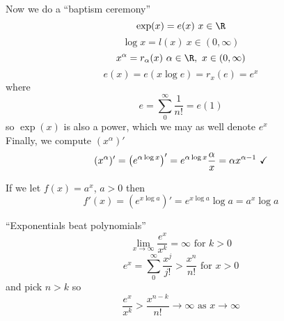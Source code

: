 \begin{normal}
Now we do a ``baptism ceremony''
\[\exp(x) = e(x) \ x\in \R\]
\[\log x = l(x) \ x\in (0,\infty)\]
\[x^\alpha = r_\alpha(x) \ \alpha \in \R, \ x\in (0,\infty)\]
\[e(x) = e(x\log e) = r_x(e) = e^x\]
where
\[e = \sum_0^\infty \frac{1}{n!} = e(1)\] so $\exp(x)$ is also a power, which we may as well denote $e^x$\\
Finally, we compute $(x^\alpha)'$\\
\[(x^\alpha)' = \left(e^{\alpha\log x}\right)' = e^{\alpha\log x}\frac{\alpha}{x} = \alpha x^{\alpha - 1} \ \tick\]
\end{normal}
\begin{note}
If we let $f(x) = a^x$, $a>0$ then
\[f'(x) = \left(e^{x\log a}\right)' = e^{x\log a}\log a = a^x \log a\]
\end{note}
\begin{remark}
``Exponentials beat polynomials''
\[\lim_{x\to \infty} \frac{e^x}{x^k} =\infty \text{ for }k>0\]
\[e^x = \sum_0^{\infty}\frac{x^j}{j!} > \frac{x^n}{n!} \text{ for }x>0\]
and pick $n>k$ so
\[\frac{e^x}{x^k} > \frac{x^{n-k}}{n!}\to \infty\text{ as }x\to \infty\]
\end{remark}
